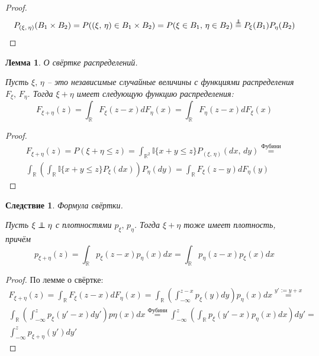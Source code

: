 \documentclass[a4paper,12pt]{article}
\renewcommand{\leq}{\ensuremath{\leqslant}}
\newcommand\independent{\protect\mathpalette{\protect\independenT}{\perp}}
\def\independenT#1#2{\mathrel{\rlap{$#1#2$}\mkern2mu{#1#2}}}
\theoremstyle{plain}
\newtheorem{lemma}{Лемма}[section]
\newtheorem*{corollary}{Следствие}
\theoremstyle{definition}
\theoremstyle{remark}
\begin{document}
\begin{proof}
  \[
    P_{(\xi,\,\eta)}(B_1 \times B_2) = P((\xi,\,\eta) \in B_1 \times B_2) = P(\xi \in B_1,\, \eta \in B_2) \stackrel{\independent}{=} P_\xi(B_1)P_\eta(B_2)
  \]
\end{proof}

\begin{lemma}
  О свёртке распределений.

  Пусть $\xi,\, \eta$ -- это независимые случайные величины с функциями распределения $F_\xi,\, F_\eta$. Тогда $\xi + \eta$ имеет следующую функцию распределения:
  \[F_{\xi + \eta}(z) = \int_\mathbb{R}F_\xi(z - x)dF_\eta(x) = \int_\mathbb{R}F_\eta(z - x)dF_\xi(x)\]
\end{lemma}

\begin{proof}
  \begin{align*}
    F_{\xi + \eta}(z) = P(\xi + \eta \leq z) = \int_{\mathbb{R}^2}\mathbb{I}\{x + y \leq z\}P_{(\xi,\,\eta)}(dx,\, dy) \stackrel{\text{Фубини}}{=}\\
    \int_\mathbb{R}\left(\int_\mathbb{R}\mathbb{I}\{x + y \leq z\}P_\xi(dx)\right)P_\eta(dy) = \int_\mathbb{R} F_\xi(z - y)dF_\eta(y)
  \end{align*}
\end{proof}

\begin{corollary}
  Формула свёртки.

  Пусть $\xi \independent \eta$ с плотностями $p_\xi,\, p_\eta$. Тогда $\xi + \eta$ тоже имеет плотность, причём
  \[p_{\xi + \eta}(z) = \int_\mathbb{R}p_\xi(z - x)p_\eta(x)dx = \int_\mathbb{R} p_\eta(z - x)p_\xi(x)dx\]
\end{corollary}

\begin{proof}
  По лемме о свёртке:
  \begin{align*}
    F_{\xi + \eta}(z) = \int_\mathbb{R}F_\xi(z - x)dF_\eta(x) = \int_\mathbb{R}\left(\int_{-\infty}^{z - x}p_\xi(y)dy\right)p_\eta(x)dx \stackrel{y' := y + x}{=} \\
    \int_\mathbb{R} \left(\int_{-\infty}^z p_\xi(y' - x)dy'\right)p\eta(x)dx \stackrel{\text{Фубини}}{=} \int_{-\infty}^z \left(\int_\mathbb{R}p_\xi(y' - x)p_\eta(x)dx\right)dy' = \\
    \int_{-\infty}^z p_{\xi + \eta}(y')dy'
  \end{align*}
\end{proof}
\end{document}
